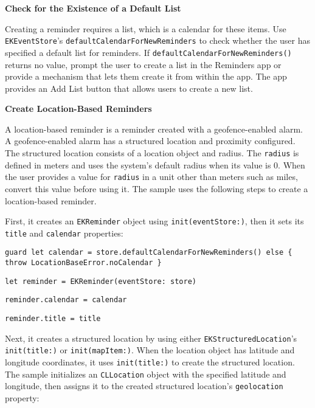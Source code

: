 \documentclass{article}
\begin{document}
\noindent
\textbf{Check for the Existence of a Default List}

\noindent
Creating a reminder requires a list, which is a calendar for these items. Use \texttt{EKEventStore}'s \texttt{defaultCalendarForNewReminders} to check whether the user has specified a default list for reminders. If \texttt{defaultCalendarForNewReminders()} returns no value, prompt the user to create a list in the Reminders app or provide a mechanism that lets them create it from within the app. The app provides an Add List button that allows users to create a new list.

\noindent
\textbf{Create Location-Based Reminders}

\noindent
A location-based reminder is a reminder created with a geofence-enabled alarm. A geofence-enabled alarm has a structured location and proximity configured. The structured location consists of a location object and radius. The \texttt{radius} is defined in meters and uses the system's default radius when its value is 0. When the user provides a value for \texttt{radius} in a unit other than meters such as miles, convert this value before using it. The sample uses the following steps to create a location-based reminder.

\noindent
First, it creates an \texttt{EKReminder} object using \texttt{init(eventStore:)}, then it sets its \texttt{title} and \texttt{calendar} properties:

\noindent
\texttt{guard let calendar = store.defaultCalendarForNewReminders() else \{ throw LocationBaseError.noCalendar \}}

\noindent
\texttt{let reminder = EKReminder(eventStore: store)}

\noindent
\texttt{reminder.calendar = calendar}

\noindent
\texttt{reminder.title = title}

\noindent
{}

\noindent
Next, it creates a structured location by using either \texttt{EKStructuredLocation}'s \texttt{init(title:)} or \texttt{init(mapItem:)}. When the location object has latitude and longitude coordinates, it uses \texttt{init(title:)} to create the structured location. The sample initializes an \texttt{CLLocation} object with the specified latitude and longitude, then assigns it to the created structured location's \texttt{geolocation} property:
\end{document}
